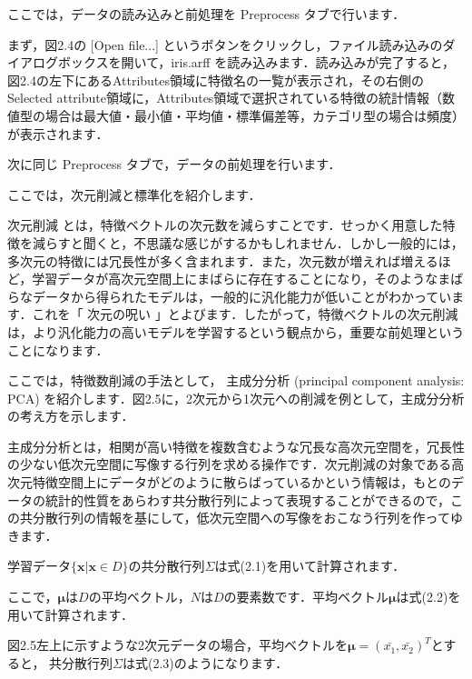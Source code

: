 ここでは，データの読み込みと前処理を Preprocess タブで行います．

まず，図2.4の [Open file...] というボタンをクリックし，ファイル読み込みのダイアログボックスを開いて，iris.arff を読み込みます．読み込みが完了すると，図2.4の左下にあるAttributes領域に特徴名の一覧が表示され，その右側のSelected attribute領域に，Attributes領域で選択されている特徴の統計情報（数値型の場合は最大値・最小値・平均値・標準偏差等，カテゴリ型の場合は頻度）が表示されます．

次に同じ Preprocess タブで，データの前処理を行います．


ここでは，次元削減と標準化を紹介します．

次元削減
とは，特徴ベクトルの次元数を減らすことです．せっかく用意した特徴を減らすと聞くと，不思議な感じがするかもしれません．しかし一般的には，多次元の特徴には冗長性が多く含まれます．また，次元数が増えれば増えるほど，学習データが高次元空間上にまばらに存在することになり，そのようなまばらなデータから得られたモデルは，一般的に汎化能力が低いことがわかっています．これを「
次元の呪い
」とよびます．したがって，特徴ベクトルの次元削減は，より汎化能力の高いモデルを学習するという観点から，重要な前処理ということになります．


ここでは，特徴数削減の手法として，
主成分分析 (principal component analysis: PCA) 
を紹介します．図2.5に，2次元から1次元への削減を例として，主成分分析の考え方を示します．


主成分分析とは，相関が高い特徴を複数含むような冗長な高次元空間を，冗長性の少ない低次元空間に写像する行列を求める操作です．次元削減の対象である高次元特徴空間上にデータがどのように散らばっているかという情報は，もとのデータの統計的性質をあらわす共分散行列によって表現することができるので，この共分散行列の情報を基にして，低次元空間への写像をおこなう行列を作ってゆきます．

学習データ$\{\bm{x} | \bm{x} \in D\}$の共分散行列$\Sigma$は式(2.1)を用いて計算されます．


ここで，$\bm{\mu}$は$D$の平均ベクトル，$N$は$D$の要素数です．平均ベクトル$\bm{\mu}$は式(2.2)を用いて計算されます．


図2.5左上に示すような2次元データの場合，平均ベクトルを$\bm{\mu}=(\bar{x_1}, \bar{x_2})^T$とすると，
共分散行列$\Sigma$は式(2.3)のようになります．


